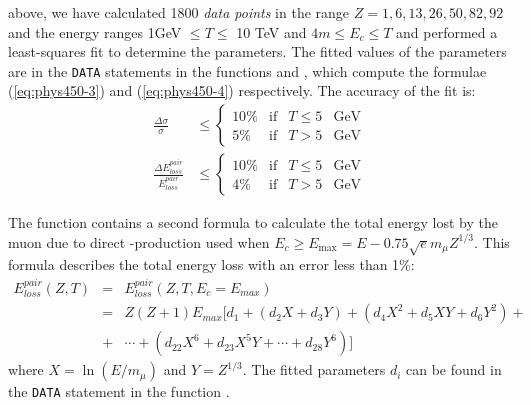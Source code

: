 above, we have calculated  1800 {\it data points} in the range
$Z = 1, 6, 13, 26, 50, 82, 92$ and the energy ranges 1GeV $ \leq T \leq $ 10
TeV and $ 4m \leq E_c \leq T$
and performed a least-squares fit to determine the parameters.
The fitted values of the parameters are in the {\tt DATA} statements in the
functions  and , which compute the formulae 
(\ref{eq:phys450-3}) and (\ref{eq:phys450-4}) respectively.
The accuracy of the fit is:
\[ \begin{array}{LL}
\frac{\Delta \sigma}{\sigma} & \leq  \left\{
\begin{array}{RcLl}
10\% & \mbox{if} & T\leq 5 & \mbox{GeV} \\
5\%  & \mbox{if} & T > 5 & \mbox{GeV}
\end{array} \right . \\ [0.5cm]
\frac{\Delta E_{loss}^{pair}}{E_{loss}^{pair}}  & \leq \left\{
\begin{array}{RcLl}
10\% & \mbox{if} & T\leq 5 & \mbox{GeV} \\
4\%  & \mbox{if} & T > 5 & \mbox{GeV}
\end{array} \right.
\end{array} \]
 
The function  contains a second formula to calculate the total
energy lost by the muon due to direct \Pep\Pem-production 
used when $E_c\geq E_{\mbox{max}} = E-0.75 \surd e m_{\mu}Z^{1/3}$.
This formula describes the total energy loss with an error less than 1\%:
\begin{eqnarray}
E_{loss}^{pair}(Z,T) & = &
E_{loss}^{pair}(Z,T,E_c=E_{max}) \\
& = & Z(Z+1) E_{max} [d_1+(d_2X+d_3Y)+(d_4X^2+d_5XY+d_6Y^2)+ \nonumber\\
&+ & \cdots+(d_{22}X^6+d_{23}X^5Y+\cdots+d_{28}Y^6)] \nonumber
\end{eqnarray}
where $ X=\ln(E/m_{\mu}) $ and $Y=Z^{1/3}$.
The fitted parameters $d_i$ can be found in the {\tt DATA} 
statement in the function .

